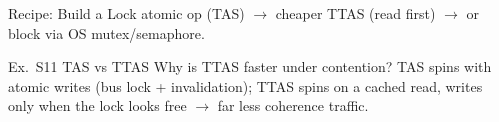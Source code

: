 \begin{KR}{Recipe: Build a Lock}
    atomic op (TAS) $\to$ cheaper TTAS (read first) $\to$ or block via OS mutex/semaphore.
\end{KR}

\begin{example2}{Ex.\ S11 TAS vs TTAS}
    Why is TTAS faster under contention?
    \tcblower
    TAS spins with atomic writes (bus lock + invalidation); TTAS spins on a cached read, writes only when the lock looks free $\to$ far less coherence traffic.
\end{example2}

